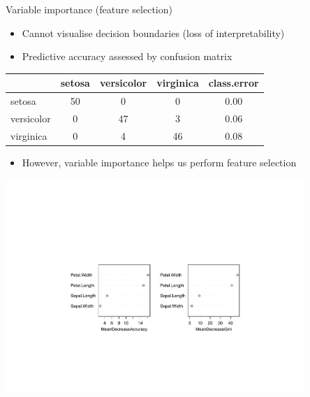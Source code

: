 \documentclass[pdf]{beamer}
\begin{document}
\begin{frame}{Variable importance (feature selection)}
\begin{itemize}
\item Cannot visualise decision boundaries (loss of interpretability)
\item Predictive accuracy assessed by confusion matrix
\end{itemize}
\begin{table}[h]
\begin{tabular}{l|c|c|c|c}
		& setosa & versicolor & virginica & class.error \\ \hline
setosa  & 50     & 0          & 0        & 0.00 \\
versicolor      & 0         & 47         & 3        & 0.06 \\
virginica       & 0         & 4        & 46        & 0.08
\end{tabular}
\end{table}
\begin{itemize}
	\item However, variable importance helps us perform feature selection 
\end{itemize}
\begin{center}
	\includegraphics[width=0.85\textwidth]{varImportance.pdf}
\end{center}
\end{frame}
\end{document}
